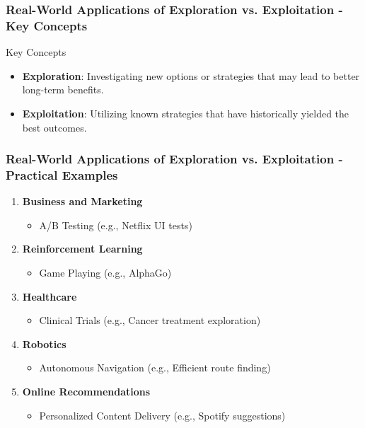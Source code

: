 \documentclass[aspectratio=169]{beamer}
\begin{document}
\begin{frame}[fragile]
    \frametitle{Real-World Applications of Exploration vs. Exploitation - Key Concepts}
    \begin{block}{Key Concepts}
        \begin{itemize}
            \item \textbf{Exploration}: Investigating new options or strategies that may lead to better long-term benefits.
            \item \textbf{Exploitation}: Utilizing known strategies that have historically yielded the best outcomes.
        \end{itemize}
    \end{block}
\end{frame}

\begin{frame}[fragile]
    \frametitle{Real-World Applications of Exploration vs. Exploitation - Practical Examples}
    \begin{enumerate}
        \item \textbf{Business and Marketing}
            \begin{itemize}
                \item A/B Testing (e.g., Netflix UI tests)
            \end{itemize}
        \item \textbf{Reinforcement Learning}
            \begin{itemize}
                \item Game Playing (e.g., AlphaGo)
            \end{itemize}
        \item \textbf{Healthcare}
            \begin{itemize}
                \item Clinical Trials (e.g., Cancer treatment exploration)
            \end{itemize}
        \item \textbf{Robotics}
            \begin{itemize}
                \item Autonomous Navigation (e.g., Efficient route finding)
            \end{itemize}
        \item \textbf{Online Recommendations}
            \begin{itemize}
                \item Personalized Content Delivery (e.g., Spotify suggestions)
            \end{itemize}
    \end{enumerate}
\end{frame}
\end{document}
